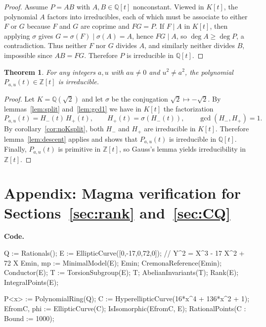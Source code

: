 \documentclass[12pt]{article}
\newtheorem{theorem}{Theorem}
\theoremstyle{remark}
\theoremstyle{definition}
\begin{document}
\begin{proof}
Assume $P=AB$ with $A,B\in\mathbb{Q}[t]$ nonconstant.
Viewed in $K[t]$, the polynomial $A$ factors into irreducibles, each of which must be associate to either $F$ or $G$ because $F$ and $G$ are coprime and $FG=P$.
If $F\mid A$ in $K[t]$, then applying $\sigma$ gives $G=\sigma(F)\mid\sigma(A)=A$, hence $FG\mid A$, so $\deg A\ge\deg P$, a contradiction.
Thus neither $F$ nor $G$ divides $A$, and similarly neither divides $B$, impossible since $AB=FG$.
Therefore $P$ is irreducible in $\mathbb{Q}[t]$.
\end{proof}

\begin{theorem}\label{thm:main}
For any integers $a,u$ with $au\neq0$ and $u^2\neq a^2$, the polynomial $P_{a,u}(t)\in\mathbb{Z}[t]$ is irreducible.
\end{theorem}

\begin{proof}
Let $K=\mathbb{Q}(\sqrt2)$ and let $\sigma$ be the conjugation $\sqrt2\mapsto-\sqrt2$.
By lemmas~\ref{lem:split} and~\ref{lem:gcd1} we have in $K[t]$ the factorization
\[
P_{a,u}(t)=H_-(t)\,H_+(t),\qquad H_+(t)=\sigma(H_-(t)),\qquad \gcd(H_-,H_+)=1.
\]
By corollary~\ref{cor:noKsplit}, both $H_-$ and $H_+$ are irreducible in $K[t]$.
Therefore lemma~\ref{lem:descent} applies and shows that $P_{a,u}(t)$ is irreducible in $\mathbb{Q}[t]$.
Finally, $P_{a,u}(t)$ is primitive in $\mathbb{Z}[t]$, so Gauss's lemma \cite{LangAlgebra} yields irreducibility in $\mathbb{Z}[t]$.
\end{proof}


\appendix
\section*{Appendix: Magma verification for Sections~\ref{sec:rank} and~\ref{sec:CQ}}\label{app:magma}

\noindent\textbf{Code.}
\begin{code}
Q := Rationals();
E := EllipticCurve([0,-17,0,72,0]); // Y^2 = X^3 - 17 X^2 + 72 X
Emin, mp := MinimalModel(E); Emin;
CremonaReference(Emin);
Conductor(E);
T := TorsionSubgroup(E); T; AbelianInvariants(T);
Rank(E);
IntegralPoints(E);

P<x> := PolynomialRing(Q);
C := HyperellipticCurve(16*x^4 + 136*x^2 + 1);
EfromC, phi := EllipticCurve(C);
IsIsomorphic(EfromC, E);
RationalPoints(C : Bound := 1000);
\end{code}
\end{document}
